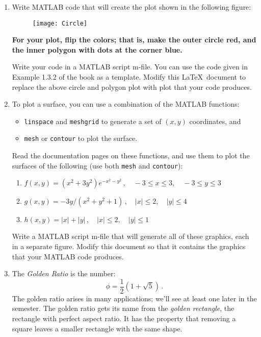 \documentclass[12pt]{article}
\begin{document}
\begin{enumerate}
\item
Write MATLAB code that will create the plot shown in the following figure:
\begin{figure}[htbp]
\begin{center}
\texttt{[image: Circle]} 
\end{center}
\end{figure}

{\bf For your plot, flip the colors; that is, make the outer circle red, and the inner polygon with dots at the corner blue.}

Write your code in a MATLAB script m-file.
You can use the code given in Example 1.3.2 of the book as a template.
Modify this \LaTeX\ document to replace the above circle and polygon plot with plot that your code produces. 

\item
To plot a surface, you can use a combination of the MATLAB functions:
\begin{itemize}
\item {\tt linspace} and {\tt meshgrid} to generate a set of $(x,y)$ coordinates, and
\item {\tt mesh} or {\tt contour} to plot the surface.
\end{itemize}
Read the documentation pages on these functions, and use them to plot
the surfaces of the following (use both {\tt mesh} and {\tt contour}):
\begin{enumerate}
\item
$\displaystyle f(x,y) = (x^2 + 3y^2)e^{-x^2-y^2}\,, \quad -3 \leq x \leq 3, \quad -3 \leq y \leq 3$
\item
$\displaystyle g(x,y) = -3y/(x^2 + y^2 + 1)\,, \quad |x|\leq 2, \quad |y| \leq 4$
\item
$\displaystyle h(x,y) = |x| + |y|\,, \quad |x|\leq 2, \quad |y| \leq 1$
\end{enumerate}
Write a MATLAB script m-file that will generate all of these graphics, each in a separate figure. Modify this document so that it contains the graphics that your MATLAB code produces.
\item
The {\em Golden Ratio} is the number:
\begin{equation}
\label{gratio}
  \phi = \frac{1}{2}(1 + \sqrt{5})\,.
\end{equation}
The golden ratio arises in many applications; we'll see at least
one later in the semester.  The golden ratio gets its name from
the {\em golden rectangle}, the rectangle with perfect aspect
ratio.  It has the property that removing a square leaves a smaller
rectangle with the same shape.


\end{enumerate}
\end{document}
